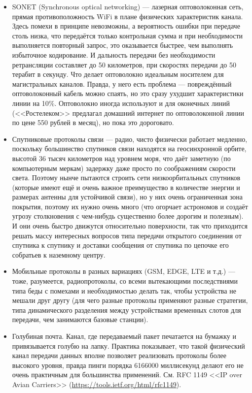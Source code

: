 \documentclass[a5paper]{article}
\begin{document}
\begin{itemize}
    \item SONET (Synchronous optical networking) --- лазерная оптоволоконная сеть, прямая противоположность WiFi в плане физических характеристик канала. Здесь помехи в принципе невозможны, а вероятность ошибки при передаче столь низка, что передаётся только контрольная сумма и при необходимости выполняется повторный запрос, это оказывается быстрее, чем выполнять избыточное кодирование. И дальность передачи без необходимости ретрансляции составляет до 50 километров, при скоростях передачи до 50 терабит в секунду. Что делает оптоволокно идеальным носителем для магистральных каналов. Правда, у него есть проблема --- повреждённый оптоволоконный кабель можно спаять, но это сразу ухудшит характеристики линии на 10\%. Оптоволокно иногда используют и для оконечных линий (<<Ростелеком>> предлагал домашний интернет по оптоволоконной линии по цене 550 рублей в месяц), но пока это дороговато.
    \item Спутниковые протоколы связи --- радио, чисто физически работает медленно, поскольку большинство спутников связи находятся на геосинхронной орбите, высотой 36 тысяч километров над уровнем моря, что даёт заметную (по компьютерным меркам) задержку даже просто по соображениям скорости света. Поэтому нынче пытаются строить сети низкоорбитальных спутников (которые имеют ещё и очень важное преимущество в количестве энергии и размерах антенны для устойчивой связи), но у них очень ограниченная зона покрытия, поэтому их нужно очень много (что огорчает астрономов и создаёт угрозу столкновения с чем-нибудь существенно более дорогим и полезным). И они очень быстро движутся относительно поверхности, так что приходится решать массу интересных вопросов типа передачи открытого соединения от спутника к спутнику и доставки сообщения от спутника по цепочке его собратьев к наземному центру.
    \item Мобильные протоколы в разных вариациях (GSM, EDGE, LTE и т.д.) --- тоже, разумеется, радиопротоколы, со всеми вытекающими последствиями типа беды с помехами и необходимостью делать так, чтобы устройства не мешали друг другу (для чего разные протоколы применяют разные стратегии, типа динамического разделения между устройствами временных слотов для передачи, чем занимаются базовые станции).
    \item Голубиная почта. Канал, где передаваемый пакет печатается на бумажку и привязывается голубю на лапку. Практика показывает, что такой физический канал передачи данных вполне позволяет реализовать протоколы более высокого уровня, правда пинги порядка 6166000 миллисекунд делают его не очень практичным для большинства применений. См. RFC 1149 <<IP over Avian Carriers>> (\url{https://tools.ietf.org/html/rfc1149}).
\end{itemize}
\end{document}
